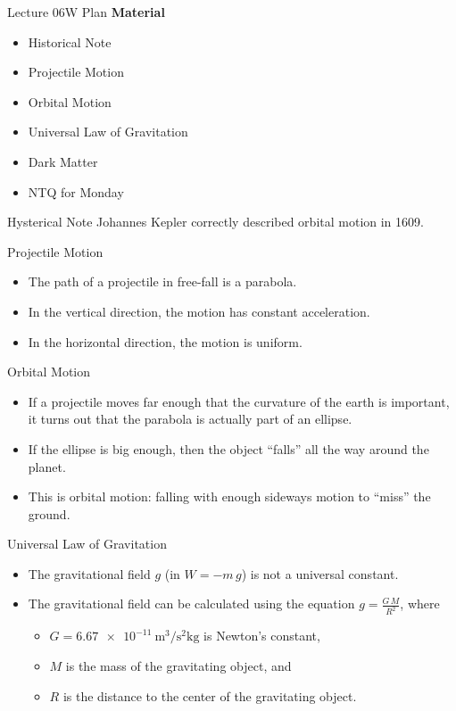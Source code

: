 \documentclass[english]{beamer}
\begin{document}
\begin{frame}{Lecture 06W Plan}
  \textbf{Material}
  \begin{itemize}
    \item Historical Note
    \item Projectile Motion
    \item Orbital Motion
    \item Universal Law of Gravitation
    \item Dark Matter
    \item NTQ for Monday
  \end{itemize}
\end{frame}

\begin{frame}{Hysterical Note}
  Johannes Kepler correctly described orbital motion in 1609.
\end{frame}

\begin{frame}{Projectile Motion}
  \begin{itemize}
    \item The path of a projectile in free-fall is a parabola.
    \item In the vertical direction, the motion has constant acceleration.
    \item In the horizontal direction, the motion is uniform.
  \end{itemize}
\end{frame}

\begin{frame}{Orbital Motion}
  \begin{itemize}
    \item If a projectile moves far enough that the curvature of the earth is important,
          it turns out that the parabola is actually part of an ellipse.
    \item If the ellipse is big enough, then the object ``falls''  all the way around the planet.
    \item This is orbital motion: falling with enough sideways motion to ``miss'' the ground.
  \end{itemize}
\end{frame}


\begin{frame}{Universal Law of Gravitation}
  \begin{itemize}
    \item The gravitational field $g$ (in $W=-m\,g$) is not a universal constant.
    \item The gravitational field can be calculated using the equation $g=\frac{G\,M}{R^{2}}$, where \\
    \begin{itemize}
          \item $G=\SI{6.67e-11}{\meter^3\per\second^2\kilogram}$ is Newton's constant,
          \item $M$ is the mass of the gravitating object, and
          \item $R$ is the distance to the center of the gravitating object.
    \end{itemize}
  \end{itemize}
\end{frame}
\end{document}
